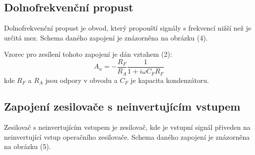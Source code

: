 \documentclass[a4paper,11pt]{article}
\begin{document}
\begin{minipage}[t]{0.5\textwidth}
            \subsection{Dolnofrekvenční propust}
                Dolnofrekvenční propust je obvod, který propouští signály s frekvencí nižší než je určitá mez. Schema daného zapojení je znázorněna na obrázku (4). 
                \par Vzorec pro zesílení tohoto zapojení je dán vztahem (2):
                \begin{equation}
                    A_u = -\frac{R_F}{R_A} \frac{1}{1 + i\omega C_F R_F}
                \end{equation}
                kde $R_F$ a $R_A$ jsou odpory v obvodu a $C_F$ je kapacita kondenzátoru.

            \subsection{Zapojení zesilovače s neinvertujícím vstupem}
                Zesilovač s neinvertujícím vstupem je zesilovač, kde je vstupní signál přiveden na neinvertující vstup operačního zesilovače. Schema daného zapojení je znázorněna na obrázku (5). 
    \end{minipage}
    \hspace{10pt}
\end{document}
